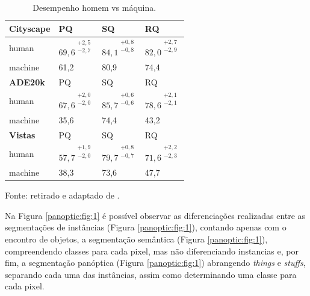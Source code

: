 \begin{table}[!ht]
    \centering
    \caption{Desempenho homem vs máquina.}
    \label{panoptic:table:1}
    \begin{tabular}{@{}l|lll@{}}
    \textbf{Cityscape} & PQ   & SQ   & RQ   \\ \hline
    human              & $69,6^{\substack{+2,5\\-2,7}}$ & $84,1^{\substack{+0,8\\-0,8}}$ &  $82,0^{\substack{+2,7\\-2,9}}$ \\
    machine            & 61,2 & 80,9 & 74,4 \vspace*{0,3cm}\\
    \textbf{ADE20k}    & PQ   & SQ   & RQ   \\ \hline
    human              & $67,6^{\substack{+2,0\\-2,0}}$ & $85,7^{\substack{+0,6\\-0,6}}$ & $78,6^{\substack{+2,1\\-2,1}}$ \\
    machine            & 35,6 & 74,4 & 43,2 \vspace*{0,3cm}\\
    \textbf{Vistas}    & PQ   & SQ   & RQ   \\ \hline
    human              & $57,7^{\substack{+1,9\\-2,0}}$ & $79,7^{\substack{+0,8\\-0,7}}$ & $71,6^{\substack{+2,2\\-2,3}}$ \\
    machine            & 38,3 & 73,6 & 47,7
    \end{tabular}

    \vspace*{1 cm}
    Fonte: retirado e adaptado de \cite{Kirillov2019a}.
\end{table}

Na Figura \ref{panoptic:fig:1} é possível observar as diferenciações realizadas entre as segmentações de instâncias (Figura \ref{panoptic:fig:1}), contando apenas com o encontro de objetos, a segmentação semântica (Figura \ref{panoptic:fig:1}), compreendendo classes para cada pixel, mas não diferenciando instancias e, por fim, a segmentação panóptica (Figura \ref{panoptic:fig:1}) abrangendo \textit{things} e \textit{stuffs}, separando cada uma das instâncias, assim como determinando uma classe para cada pixel.


